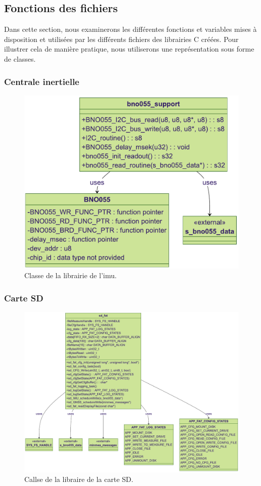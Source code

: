 \clearpage

\subsection{Fonctions des fichiers}
Dans cette section, nous examinerons les différentes fonctions et variables mises à disposition et utilisées par les différents fichiers des librairies C créées. Pour illustrer cela de manière pratique, nous utiliserons une représentation sous forme de classes.

\subsubsection{Centrale inertielle}

\begin{figure}[H]
	\centering
	\includegraphics[width=.6\linewidth]{../figures/code/diagrammes/bno-support-class}
	\caption{Classe de la librairie de l'\gls{imu}.}
	\label{fig:bno-support-class}
\end{figure}

\subsubsection{Carte SD}

\begin{figure}[H]
	\centering
	\includegraphics[width=1\linewidth]{../figures/code/diagrammes/sd-card-class}
	\caption{Callse de la libraire de la carte SD.}
	\label{fig:sd-card-class}
\end{figure}

